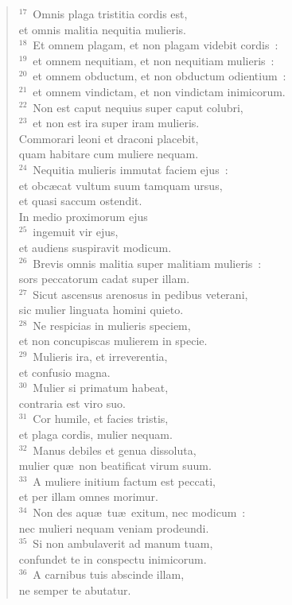 \begin{flushleft}\begin{verse}${}^{17}$~Omnis plaga tristitia cordis est,\\ et omnis malitia nequitia mulieris.\\
${}^{18}$~Et omnem plagam, et non plagam videbit cordis~:\\
${}^{19}$~et omnem nequitiam, et non nequitiam mulieris~:\\
${}^{20}$~et omnem obductum, et non obductum odientium~:\\
${}^{21}$~et omnem vindictam, et non vindictam inimicorum.\\
${}^{22}$~Non est caput nequius super caput colubri,\\
${}^{23}$~et non est ira super iram mulieris.\\ Commorari leoni et draconi placebit,\\ quam habitare cum muliere nequam.\\
${}^{24}$~Nequitia mulieris immutat faciem ejus~:\\ et obc\ae cat vultum suum tamquam ursus,\\ et quasi saccum ostendit.\\ In medio proximorum ejus\\
${}^{25}$~ingemuit vir ejus,\\ et audiens suspiravit modicum.\\
${}^{26}$~Brevis omnis malitia super malitiam mulieris~:\\ sors peccatorum cadat super illam.\\
${}^{27}$~Sicut ascensus arenosus in pedibus veterani,\\ sic mulier linguata homini quieto.\\
${}^{28}$~Ne respicias in mulieris speciem,\\ et non concupiscas mulierem in specie.\\
${}^{29}$~Mulieris ira, et irreverentia,\\ et confusio magna.\\
${}^{30}$~Mulier si primatum habeat,\\ contraria est viro suo.\\
${}^{31}$~Cor humile, et facies tristis,\\ et plaga cordis, mulier nequam.\\
${}^{32}$~Manus debiles et genua dissoluta,\\ mulier qu\ae\ non beatificat virum suum.\\
${}^{33}$~A muliere initium factum est peccati,\\ et per illam omnes morimur.\\
${}^{34}$~Non des aqu\ae\ tu\ae\ exitum, nec modicum~:\\ nec mulieri nequam veniam prodeundi.\\
${}^{35}$~Si non ambulaverit ad manum tuam,\\ confundet te in conspectu inimicorum.\\
${}^{36}$~A carnibus tuis abscinde illam,\\ ne semper te abutatur.\end{verse}\end{flushleft}


